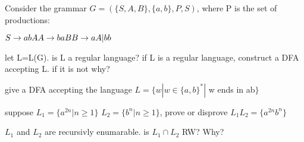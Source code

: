 \documentclass{exam}
\begin{document}
\begin{questions}
  \question
  Consider the grammar $G = (\{S,A,B\}, \{a,b\}, P, S)$, where P is the set of productions:
  \begin{center}
    $
    S \rightarrow abA\\
    A \rightarrow baB\\
    B \rightarrow aA|bb\\
    $
  \end{center}
  let L=L(G). is L a regular language? if L is a regular language, construct a DFA accepting L. if it is not why?

  \question
  give a DFA accepting the language $L = \{w|w \in \{a,b\}^* | $ w ends in ab$\}$

  \question
  suppose $L_1 = \{a^{2n}| n \ge 1\}$ $L_2 = \{b^{n}| n \ge 1\}$, prove or disprove $L_{1}L_{2} = \{a^{2n}b^n\}$

  \question
  $L_1$ and $L_2$ are recursivly enumarable. is $L_1 \cap L_2$ RW? Why?
\end{questions}
\end{document}
